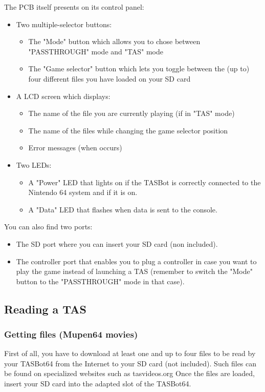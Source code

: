 \documentclass[a4paper,oneside,12pt]{article}
\begin{document}
The PCB itself presents on its control panel:
\begin{itemize}
\item Two multiple-selector buttons:
\begin{itemize}
\item The "Mode" button which allows you to chose between "PASSTHROUGH" mode and
"TAS" mode
\item The "Game selector" button which lets you toggle between the (up to) four
different files you have loaded on your SD card
\end{itemize}

\item A LCD screen which displays:
\begin{itemize}
\item The name of the file you are currently playing (if in "TAS" mode)
\item The name of the files while changing the game selector position
\item Error messages (when occurs)
\end{itemize}

\item Two LEDs:
\begin{itemize}
\item A "Power" LED that lights on if the TASBot is correctly connected to the
Nintendo 64 system and if it is on.
\item A "Data" LED that flashes when data is sent to the console.
\end{itemize}
\end{itemize}

You can also find two ports:
\begin{itemize}
\item The SD port where you can insert your SD card (non included).
\item The controller port that enables you to plug a controller in case you want
to play the game instead of launching a TAS (remember to switch the "Mode"
button to the "PASSTHROUGH" mode in that case).
\end{itemize}

\subsection{Reading a TAS}
\subsubsection{Getting files (Mupen64 movies)}
First of all, you have to download at least one and up to four files to be read
by your TASBot64 from the Internet to your SD card (not included). Such files
can be found on specialized websites such as tasvideos.org
Once the files are loaded, insert your SD card into the adapted slot of the
TASBot64.
\end{document}
